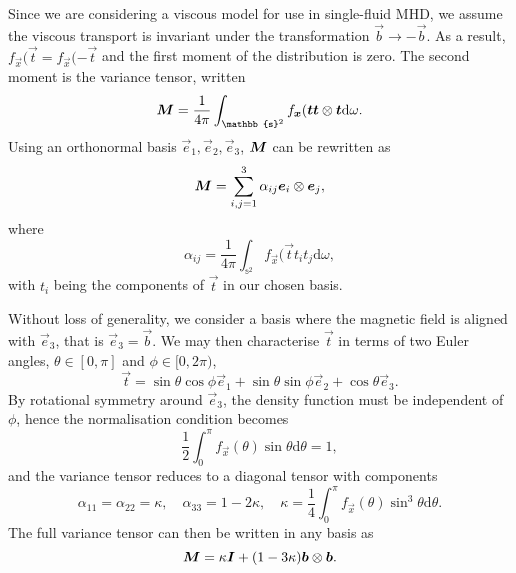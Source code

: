 Since we are considering a viscous model for use in single-fluid MHD, we assume the viscous transport is invariant under the transformation $\vec{b} \to -\vec{b}$. As a result, $f_\vec{x}(\vec{t} = f_\vec{x}(-\vec{t}$ and the first moment of the distribution is zero. The second moment is the variance tensor, written
\begin{equation}
  \label{eq:variance_tensor}
\ten{M} = \frac{1}{4\pi} \int_{\mathbb{s}^2} f_\vec{x}(\vec{t}\vec{t} \otimes \vec{t} \text{d}\omega.
\end{equation}
Using an orthonormal basis ${\vec{e}_1, \vec{e}_2, \vec{e}_3}$, ${\bm M}$ can be rewritten as
\begin{equation}
  \label{eq:variance_tensor_basis}
  {\bm M} = \sum_{i,j=1}^{3} \alpha_{ij} {\bm e}_i \otimes {\bm e}_j,
\end{equation}
where
\begin{equation}
  \label{eq:variance_components}
\alpha_{ij} = \frac{1}{4\pi} \int_{\mathbb{s}^2} f_\vec{x}(\vec{t} t_i t_j \text{d}\omega,
\end{equation}
with $t_i$ being the components of $\vec{t}$ in our chosen basis.

Without loss of generality, we consider a basis where the magnetic field is aligned with $\vec{e}_3$, that is $\vec{e}_3 = \vec{b}$. We may then characterise $\vec{t}$ in terms of two Euler angles, $\theta \in [0, \pi]$ and $\phi \in [0, 2\pi)$,
\begin{equation}
  \label{eq:t_in_euler}
\vec{t} = \sin \theta \cos \phi \vec{e}_1 + \sin \theta \sin \phi \vec{e}_2 + \cos \theta \vec{e}_3.
\end{equation}
By rotational symmetry around $\vec{e}_3$, the density function must be independent of $\phi$, hence the normalisation condition becomes
\begin{equation}
  \label{eq:normalisation_condition2}
\frac{1}{2} \int_0^{\pi} f_{\vec{x}} (\theta) \sin \theta \text{d} \theta = 1,
\end{equation}
and the variance tensor reduces to a diagonal tensor with components
\begin{equation}
  \label{eq:variance_diagonals}
\alpha_{11} = \alpha_{22} = \kappa, \quad \alpha_{33} = 1-2\kappa, \quad \kappa = \frac{1}{4} \int_0^{\pi} f_{\vec{x}} (\theta) \sin^3 \theta \text{d} \theta.
\end{equation}
The full variance tensor can then be written in any basis as
\begin{equation}
  \label{eq:variance_tensor_compact}
{\bm M} = \kappa {\bm I} + (1-3\kappa) {\bm b} \otimes {\bm b}.
\end{equation}

